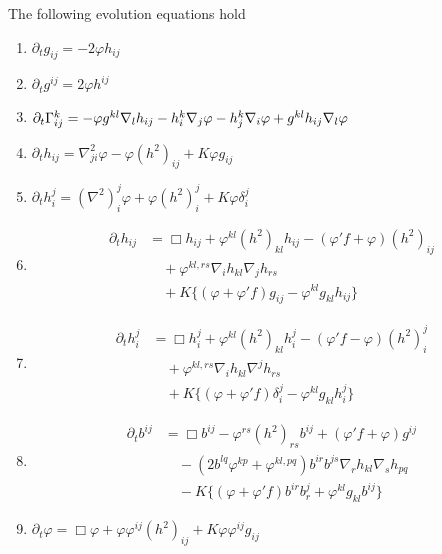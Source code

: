 \documentclass{amsart}
\begin{document}
\begin{lemma}
\label{lem:evolution}
The following evolution equations hold
\begin{enumerate}
\item \label{eq:delt_metric} $\partial_tg_{ij} = -2\varphi h_{ij}$
\item \label{eq:delt_inversemetric} $\partial_t g^{ij} = 2\varphi h^{ij}$
\item \label{eq:delt_christoffel} $\partial_t {\Gamma}^{k}_{ij} = -\varphi g^{kl} \nabla_l h_{ij} - h^k_i \nabla_j \varphi - h^k_j \nabla_i \varphi + g^{kl} h_{ij} \nabla_l \varphi$
\item \label{eq:delt_sff} $\partial_t h_{ij} = \nabla^2_{ji} \varphi - \varphi(h^2)_{ij} + K \varphi g_{ij}$
\item \label{eq:delt_weingarten} $\partial_t h_i^j = (\nabla^2)^j_i\varphi + \varphi(h^2)_i^j + K \varphi\delta_i^j$
\item \label{eq:delt_sff_box} \begin{align*}
\partial_t h_{ij} &= \Box h_{ij} + \varphi^{kl} (h^2)_{kl} h_{ij} - (\varphi'f + \varphi) (h^2)_{ij} \\
& \quad + \varphi^{kl,rs}\nabla_i h_{kl}\nabla_j h_{rs} \\
& \quad + K \{(\varphi + \varphi'f) g_{ij} - \varphi^{kl}g_{kl}h_{ij}\}
\end{align*}
\item \label{eq:delt_weingarten_box} \begin{align*}
\partial_t h_i^j &= \Box h_i^j + \varphi^{kl} (h^2)_{kl} h_i^j - (\varphi'f - \varphi) (h^2)_i^j \\
& \quad + \varphi^{kl,rs}\nabla_i h_{kl}\nabla^j h_{rs} \\
& \quad + K \{(\varphi + \varphi'f) \delta_i^j - \varphi^{kl}g_{kl}h_i^j\}
\end{align*}
\item \label{eq:delt_inversesff} \begin{align*}
\partial_t b^{ij} &= \Box b^{ij} - \varphi^{rs} (h^2)_{rs} b^{ij} + (\varphi'f + \varphi) g^{ij} \\  
& \quad - \left(2b^{lq}\varphi^{kp} + \varphi^{kl,pq}\right) b^{ir}b^{js} \nabla_r h_{kl} \nabla_s h_{pq} \\
& \quad - K \{(\varphi + \varphi'f) b^{ir}b^{j}_{r} + \varphi^{kl}g_{kl}b^{ij}\}
\end{align*}
\item \label{eq:delt_speed} $\partial_t \varphi = \Box \varphi + \varphi\varphi^{ij}(h^2)_{ij} + K \varphi\varphi^{ij}g_{ij}$
\end{enumerate}
\end{lemma}
\end{document}
